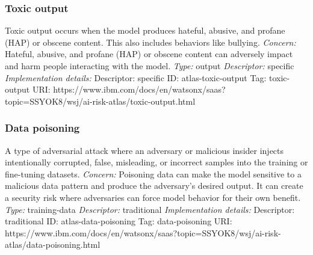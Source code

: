 \documentclass{article}
\begin{document}
\subsubsection*{Toxic output}
Toxic output occurs when the model produces hateful, abusive, and profane (HAP) or obscene content. This also includes behaviors like bullying.\newline
\textit{Concern: }Hateful, abusive, and profane (HAP) or obscene content can adversely impact and harm people interacting with the model.\newline\newline
\textit{Type: }output\newline
\textit{Descriptor: }specific \newline\newline
\textit{Implementation details:} \newline
Descriptor: specific \newline
ID: atlas-toxic-output \newline
Tag: toxic-output \newline
URI:  https://www.ibm.com/docs/en/watsonx/saas?topic=SSYOK8/wsj/ai-risk-atlas/toxic-output.html\newline
\subsubsection*{Data poisoning}
A type of adversarial attack where an adversary or malicious insider injects intentionally corrupted, false, misleading, or incorrect samples into the training or fine-tuning datasets.\newline
\textit{Concern: }Poisoning data can make the model sensitive to a malicious data pattern and produce the adversary's desired output. It can create a security risk where adversaries can force model behavior for their own benefit.\newline\newline
\textit{Type: }training-data\newline
\textit{Descriptor: }traditional \newline\newline
\textit{Implementation details:} \newline
Descriptor: traditional \newline
ID: atlas-data-poisoning \newline
Tag: data-poisoning \newline
URI:  https://www.ibm.com/docs/en/watsonx/saas?topic=SSYOK8/wsj/ai-risk-atlas/data-poisoning.html\newline
\end{document}

